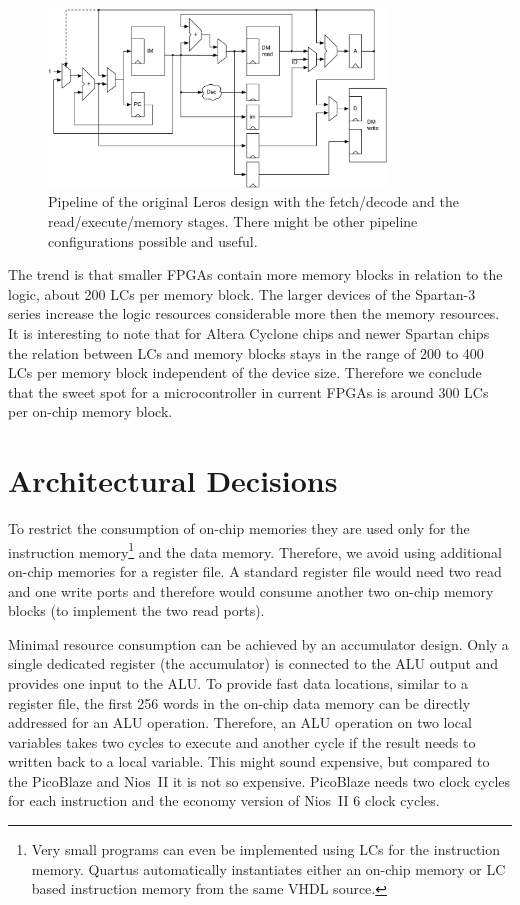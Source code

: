 \documentclass[a4paper,fontsize=10pt,twoside,DIV15,BCOR12mm,headinclude=true,footinclude=false,pagesize,bibtotoc]{scrbook}
\begin{document}
\begin{figure}[t]
    \centering
    \includegraphics[width=0.8\textwidth]{fig/pipeline}
    \caption{Pipeline of the original Leros design with the fetch/decode and the read/execute/memory stages.
    There might be other pipeline configurations possible and useful.}\label{fig:pipeline}
\end{figure}

The trend is that smaller FPGAs contain more  memory blocks in relation to the logic, about 200 LCs per memory block.
The larger devices of the Spartan-3 series increase the logic resources considerable more then the memory resources.
It is interesting to note that for Altera Cyclone chips and newer Spartan chips the relation between LCs and memory blocks stays in the range of 200 to 400 LCs per memory block independent of the device size.
Therefore we conclude that the sweet spot for a microcontroller in current FPGAs is around 300 LCs per on-chip memory block.



\section{Architectural Decisions}

To restrict the consumption of on-chip memories they are used only for the instruction memory\footnote{Very small programs can even be implemented using LCs for the instruction memory. Quartus automatically instantiates either an on-chip memory or LC based instruction memory from the same VHDL source.} and the data memory. Therefore, we avoid using additional on-chip memories for a register file. A standard register file would need two read and one write ports and therefore would consume another two on-chip memory blocks (to implement the two read ports).

Minimal resource consumption can be achieved by an accumulator design. Only a single dedicated register (the accumulator) is connected to the ALU output and provides one input to the ALU. To provide fast data locations, similar to a register file, the first 256 words in the on-chip data memory can be directly addressed for an ALU operation. Therefore, an ALU operation on two local variables takes two cycles to execute and another cycle if the result needs to written back to a local variable. This might sound expensive, but compared to the PicoBlaze and Nios~II it is not so expensive. PicoBlaze needs two clock cycles for each instruction and the economy version of Nios~II 6 clock cycles.
\end{document}
